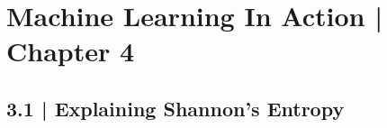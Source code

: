 \documentclass[11pt]{article}
\begin{document}
\section*{Machine Learning In Action | Chapter 4}
\subsection*{3.1 | Explaining Shannon's Entropy}
\end{document}

